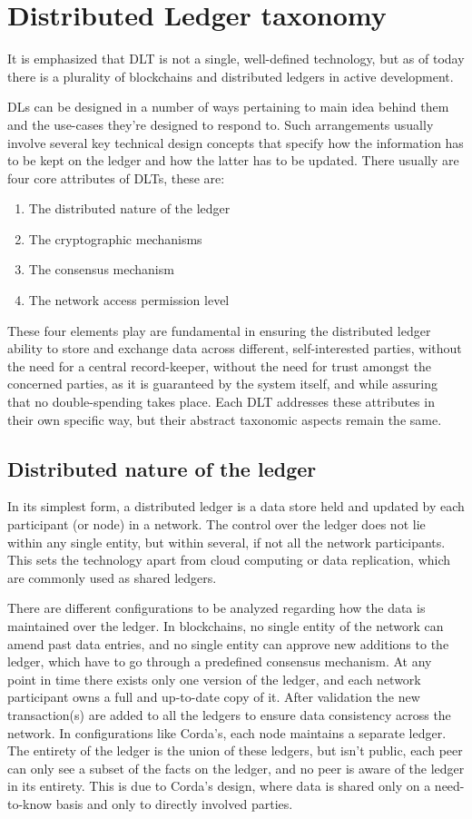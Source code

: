 \section{Distributed Ledger taxonomy}

It is emphasized that DLT is not a single, well-defined technology, but as of today there is a plurality of blockchains and distributed ledgers in active development.

DLs can be designed in a number of ways pertaining to main idea behind them and the use-cases they're designed to respond to. Such arrangements usually involve several key technical design concepts that specify how the information has to be kept on the ledger and how the latter has to be updated. 
There usually are four core attributes of DLTs, these are:
\begin{enumerate}
    \item The distributed nature of the ledger
    \item The cryptographic mechanisms
    \item The consensus mechanism
    \item The network access permission level
\end{enumerate}

These four elements play are fundamental in ensuring the distributed ledger ability to store and exchange data across different, self-interested parties, without the need for a central record-keeper, without the need for trust amongst the concerned parties, as it is guaranteed by the system itself, and while assuring that no double-spending takes place. Each DLT addresses these attributes in their own specific way, but their abstract taxonomic aspects remain the same.

\subsection{Distributed nature of the ledger}
In its simplest form, a distributed ledger is a data store held and updated by each participant (or node) in a network. The control over the ledger does not lie within any single entity, but within several, if not all the network participants. This sets the technology apart from cloud computing or data replication, which are commonly used as shared ledgers.

There are different configurations to be analyzed regarding how the data is maintained over the ledger. 
In blockchains, no single entity of the network can amend past data entries, and no single entity can approve new additions to the ledger, which have to go through a predefined consensus mechanism. At any point in time there exists only one version of the ledger, and each network participant owns a full and up-to-date copy of it.
After validation the new transaction(s) are added to all the ledgers to ensure data consistency across the network.
In configurations like Corda's, each node maintains a separate ledger. The entirety of the ledger is the union of these ledgers, but isn't public, each peer can only see a subset of the facts on the ledger, and no peer is aware of the ledger in its entirety. This is due to Corda's design, where data is shared only on a need-to-know basis and only to directly involved parties.

